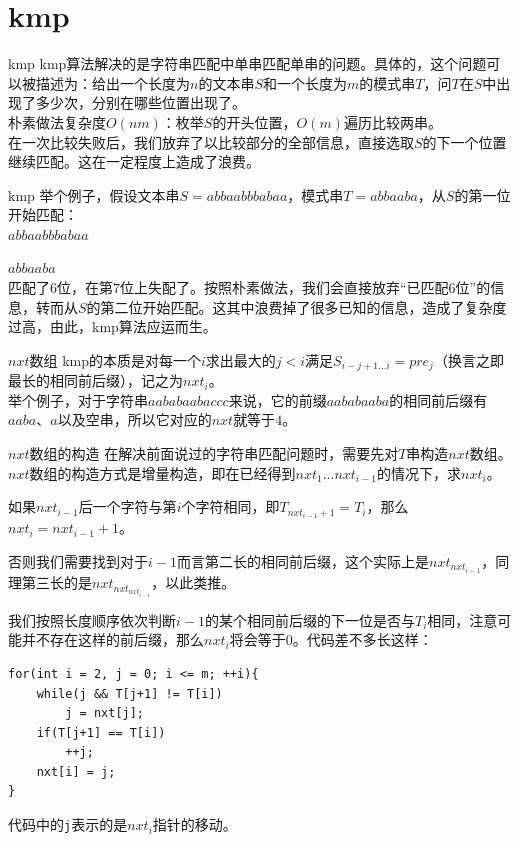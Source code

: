 \documentclass{beamer}
\begin{document}
\section{kmp}
\begin{frame}{kmp}
	kmp算法解决的是字符串匹配中单串匹配单串的问题。具体的，这个问题可以被描述为：给出一个长度为$n$的文本串$S$和一个长度为$m$的模式串$T$，问$T$在$S$中出现了多少次，分别在哪些位置出现了。\\
	
	朴素做法复杂度$O(nm)$：枚举$S$的开头位置，$O(m)$遍历比较两串。\\
	
	在一次比较失败后，我们放弃了以比较部分的全部信息，直接选取$S$的下一个位置继续匹配。这在一定程度上造成了浪费。
	
\end{frame}
\begin{frame}{kmp}
	举个例子，假设文本串$S=abbaabbbabaa$，模式串$T=abbaaba$，从$S$的第一位开始匹配：
	\pause\\
	
	{\color{red} $abbaab$}$bbabaa$
	
	{\color{blue} $abbaab$}$a$
	\pause\\
	
	匹配了$6$位，在第$7$位上失配了。按照朴素做法，我们会直接放弃“已匹配$6$位”的信息，转而从$S$的第二位开始匹配。这其中浪费掉了很多已知的信息，造成了复杂度过高，由此，kmp算法应运而生。
\end{frame}
\begin{frame}{$nxt$数组}
	kmp的本质是对每一个$i$求出最大的$j<i$满足$S_{i-j+1...i}=pre_j$（换言之即最长的相同前后缀），记之为$nxt_i$。\\
	
	举个例子，对于字符串$aababaabaccc$来说，它的前缀$aababaaba$的相同前后缀有$aaba$、$a$以及空串，所以它对应的$nxt$就等于$4$。
	
\end{frame}
\begin{frame}[fragile]{$nxt$数组的构造}
	在解决前面说过的字符串匹配问题时，需要先对$T$串构造$nxt$数组。$nxt$数组的构造方式是增量构造，即在已经得到$nxt_1...nxt_{i-1}$的情况下，求$nxt_i$。
	\pause
	
	如果$nxt_{i-1}$后一个字符与第$i$个字符相同，即$T_{nxt_{i-1}+1}=T_i$，那么$nxt_i=nxt_{i-1}+1$。
	\pause
	
	否则我们需要找到对于$i-1$而言第二长的相同前后缀，这个实际上是$nxt_{nxt_{i-1}}$，同理第三长的是$nxt_{nxt_{nxt_{i-1}}}$，以此类推。
	\pause
	
	我们按照长度顺序依次判断$i-1$的某个相同前后缀的下一位是否与$T_i$相同，注意可能并不存在这样的前后缀，那么$nxt_i$将会等于$0$。\pause 代码差不多长这样：
	
\begin{verbatim}
for(int i = 2, j = 0; i <= m; ++i){
    while(j && T[j+1] != T[i])
        j = nxt[j];
    if(T[j+1] == T[i])
        ++j;
    nxt[i] = j;
}
\end{verbatim}
	
	代码中的\texttt{j}表示的是$nxt_i$指针的移动。
\end{frame}
\end{document}

